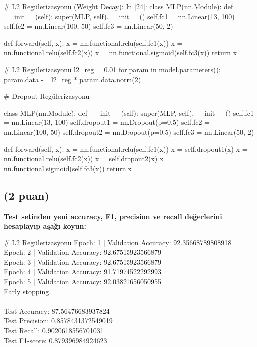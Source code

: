 \documentclass[11pt]{article}
\begin{document}
\begin{python}
# L2 Regülerizasyonu (Weight Decay):
In [24]:
class MLP(nn.Module):
    def __init__(self):
        super(MLP, self).__init__()
        self.fc1 = nn.Linear(13, 100)
        self.fc2 = nn.Linear(100, 50)
        self.fc3 = nn.Linear(50, 2)
        
    def forward(self, x):
        x = nn.functional.relu(self.fc1(x))
        x = nn.functional.relu(self.fc2(x))
        x = nn.functional.sigmoid(self.fc3(x))
        return x
    
# L2 Regülerizasyonu
l2_reg = 0.01
for param in model.parameters():
    param.data -= l2_reg * param.data.norm(2)

    # Dropout Regülerizasyonu

class MLP(nn.Module):
    def __init__(self):
        super(MLP, self).__init__()
        self.fc1 = nn.Linear(13, 100)
        self.dropout1 = nn.Dropout(p=0.5)
        self.fc2 = nn.Linear(100, 50)
        self.dropout2 = nn.Dropout(p=0.5)
        self.fc3 = nn.Linear(50, 2)
        
    def forward(self, x):
        x = nn.functional.relu(self.fc1(x))
        x = self.dropout1(x)
        x = nn.functional.relu(self.fc2(x))
        x = self.dropout2(x)
        x = nn.functional.sigmoid(self.fc3(x))
        return x

\end{python}

\subsection{(2 puan)} \textbf{Test setinden yeni accuracy, F1, precision ve recall değerlerini hesaplayıp aşağı koyun:}

# L2 Regülerizasyonu
Epoch: 1 | Validation Accuracy: 92.35668789808918 \\
Epoch: 2 | Validation Accuracy: 92.67515923566879 \\ 
Epoch: 3 | Validation Accuracy: 92.67515923566879 \\ 
Epoch: 4 | Validation Accuracy: 91.71974522292993 \\ 
Epoch: 5 | Validation Accuracy: 92.03821656050955 \\ 
Early stopping. \\ 
\\ 
Test Accuracy: 87.56476683937824\\ 
Test Precision: 0.8578431372549019\\ 
Test Recall: 0.9020618556701031\\ 
Test F1-score: 0.879396984924623\\ 
\end{document}
